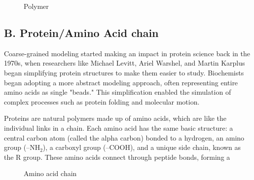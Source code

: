 \documentclass[12pt]{article}
\begin{document}
\begin{flushleft}

\begin{figure}[!ht]
  \centering
  
  \caption{Polymer}
\end{figure}






\vspace{-1em} 




\vspace{-2em} 
\subsection*{B. Protein/Amino Acid chain}
Coarse-grained modeling started making an impact in protein science back in the 1970s, when researchers like Michael Levitt, Ariel Warshel, and Martin Karplus began simplifying protein structures to make them easier to study.
Biochemists began adopting a more abstract modeling approach, often representing entire amino acids as single "beads." This simplification enabled the simulation of complex processes such as protein folding and molecular motion.

Proteins are natural polymers made up of amino acids, which are like the individual links in a chain. Each amino acid has the same basic structure: a central carbon atom (called the alpha carbon) bonded to a hydrogen, an amino group (–NH$_2$), a carboxyl group (–COOH), and a unique side chain, known as the R group. These amino acids connect through peptide bonds, forming a 

\begin{figure}[!ht]
  \centering
  
  \caption{Amino acid chain}
\end{figure}


\end{flushleft}
\end{document}
